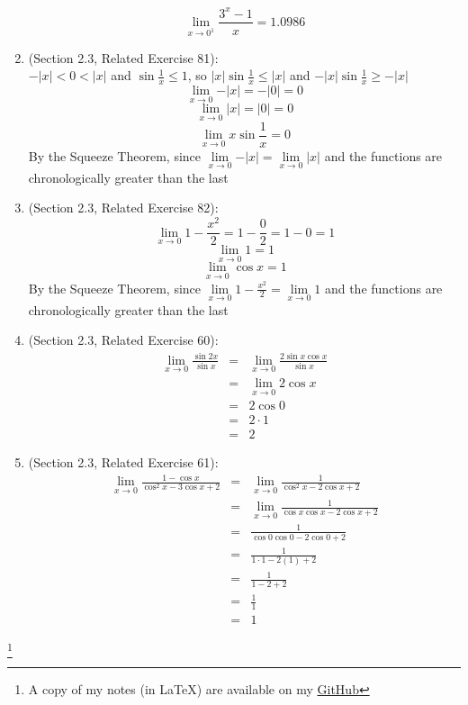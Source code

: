 \documentclass{article}
\newcommand\blfootnote[1]{
    \begingroup
    \renewcommand\thefootnote{}\footnote{#1}
    \addtocounter{footnote}{-1}
    \endgroup
}
\begin{document}
\begin{enumerate}
		    $$\lim_{x \to 0^1}{\frac{3^x-1}{x}} = 1.0986$$
    \item (Section 2.3, Related Exercise 81):
	    \\ $-|x| < 0 < |x|$ and $\sin{\frac{1}{x}} \leq 1$, so $|x| \sin{\frac{1}{x}} \leq |x|$ and $-|x| \sin{\frac{1}{x}} \geq -|x|$
		$$\lim_{x \to 0}{-|x|} = -|0| = 0$$
		$$\lim_{x \to 0}{|x|} = |0| = 0$$
		$$\lim_{x \to 0}{x \sin{\frac{1}{x}}} = 0$$
		By the Squeeze Theorem, since $\lim\limits_{x \to 0}{-|x|} = \lim\limits_{x \to 0}{|x|}$ and the functions are chronologically greater than the last
    \item (Section 2.3, Related Exercise 82):
		$$\lim_{x \to 0}{1 - \frac{x^2}{2}} = 1 -\frac{0}{2} = 1 - 0 = 1$$
		$$\lim_{x \to 0}{1} = 1$$
		$$\lim_{x \to 0}{\cos{x}} = 1$$
		By the Squeeze Theorem, since $\lim\limits_{x \to 0}{1 - \frac{x^2}{2}} = \lim\limits_{x \to 0}{1}$ and the functions are chronologically greater than the last
    \item (Section 2.3, Related Exercise 60):
	    \begin{eqnarray}
	    \lim_{x \to 0}{\frac{\sin{2x}}{\sin{x}}} &=& \lim_{x \to 0}{\frac{2\sin{x}\cos{x}}{\sin{x}}} \\
	    &=& \lim_{x \to 0}{2 \cos{x}} \\
	    &=& 2 \cos{0} \\
	    &=& 2 \cdot 1 \\
	    &=& 2
	    \end{eqnarray}
    \item (Section 2.3, Related Exercise 61):
	    \begin{eqnarray}
	    \lim_{x \to 0}{\frac{1 - \cos{x}}{\cos^2{x} - 3 \cos{x} + 2}} &=& \lim_{x \to 0}{\frac{1}{\cos^2{x} - 2 \cos{x} + 2}} \\
	    &=& \lim_{x \to 0}{\frac{1}{\cos{x} \cos{x} - 2 \cos{x} + 2}} \\
	    &=& \frac{1}{\cos{0} \cos{0} - 2 \cos{0} + 2} \\
	    &=& \frac{1}{1 \cdot 1 - 2(1) + 2} \\
	    &=& \frac{1}{1 - 2 + 2} \\
	    &=& \frac{1}{1} \\
	    &=& 1
	    \end{eqnarray}
\end{enumerate}
\blfootnote{A copy of my notes (in \LaTeX) are available on my \href{https://github.com/onlinechronically/MATH-211}{GitHub}}
\end{document}
